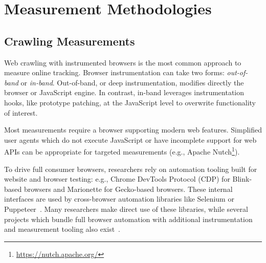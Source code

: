 \section{Measurement Methodologies}
\label{sec:measurement-methodologies}

\subsection{Crawling Measurements}
\label{sec:crawling}

Web crawling with instrumented browsers is the most common approach to measure online tracking.
Browser instrumentation can take two forms: \textit{out-of-band} or \textit{in-band}. Out-of-band, or deep instrumentation, modifies directly the browser or JavaScript engine. In contrast, in-band leverages instrumentation hooks, like prototype patching, at the JavaScript level to overwrite functionality of interest.

 Most measurements require a browser supporting modern web features.
Simplified user agents which do not execute JavaScript or have incomplete support for web APIs can be appropriate for targeted measurements (e.g., Apache Nutch\footnote{\url{https://nutch.apache.org/}}). 

 To drive full consumer browsers, researchers rely on automation tooling built for website and browser testing: e.g., Chrome DevTools Protocol (CDP) for Blink-based browsers and Marionette for Gecko-based browsers. These internal interfaces are used by cross-browser automation libraries like Selenium or Puppeteer~\cite{
cross-browser-testing-1-2020,puppeteer-support-firefox-2024}.
Many researchers make direct use of these libraries, while several projects which bundle full browser automation with additional instrumentation and measurement tooling also exist~\cite{englehardtOnlineTracking1millionsite2016,openwpm4StudiesUsing,mayerFourthpartyFourthpartyFourthParty2011}.


